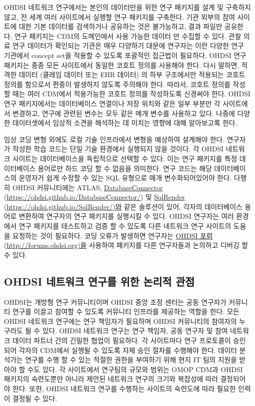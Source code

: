 \documentclass[11pt]{book}
\theoremstyle{definition}
\theoremstyle{definition}
\theoremstyle{definition}
\theoremstyle{remark}
\begin{document}
OHDSI 네트워크 연구에서는 본인의 데이터만을 위한 연구 패키지를 설계 및
구축하지 않고, 전 세계 여러 사이트에서 실행할 연구 패키지를 구축한다.
기관 외부의 참여 사이트에 대한 기본 데이터를 검색하거나 공유하는 것은
불가능하고, 결과 파일만 공유한다. 연구 패키지는 CDM의 도메인에서 사용
가능한 데이터 만 수집할 수 있다. 관찰 의료 연구 데이터가 확인되는 기관은
매우 다양하기 대문에 연구자는 이런 다양한 연구 기관에서 concept set을
적용할 수 있도록 포괄적인 접근법이 필요하다. OHDSI 연구 패키지는 종종
모든 사이트에서 동일한 코호트 정의를 사용해야 한다. 다시 말하면, 적격한
데이터 (클레임 데이터 또는 EHR 데이터) 의 하부 구조에서만 적용되는
코호트 정의를 함으로서 편중이 발생하지 않도록 주의해야 한다. 따라서,
코호트 정의를 작성할 때는 여러 CDM에서 적용가능한 코호트 정의를
작성하도록 신경써야 한다. OHDSI 연구 패키지에서는 데이터베이스 연결이나
저장 위치와 같은 일부 부분만 각 사이트에서 변경하고, 연구에 관련된
변수는 모두 같은 메개 변수를 사용하고 있다. 나중에 다양한 데이터셋에서
임상적 소견을 해석하는 데 미치는 영향에 대해 알아보고록 한다.

임상 코딩 변형 외에도 로컬 기술 인프라에서 변형을 예상하여 설계해야
한다. 연구자가 작성한 학습 코드는 단일 기술 환경에서 실행되지 않을
것이다. 각 OHDSI 네트워크 사이트는 데이터베이스을 독립적으로 선택할 수
있다. 이는 연구 패키지를 특정 데이터베이스 용어로만 하드 코딩 할 수
없음을 의미한다. 연구 코드는 해당 데이터베이스의 운영자가 쉽게 수정할 수
있는 SQL 유형으로 매개 변수화되어있어야 한다. 다행히 OHDSI 커뮤니티에는
ATLAS, \protect\hyperlink{DatabaseConnector}{DatabaseConnector}
(\url{https://ohdsi.github.io/DatabaseConnector/}) 및
\protect\hyperlink{SqlRender}{SqlRender}
(\url{https://ohdsi.github.io/SqlRender/)와} 같은 솔루션이 있어, 각자의
데이터베이스 용어로 변환하여 연구자의 연구 패키지를 실행시킬 수 있다.
OHDSI 연구자는 여러 환경에서 연구 패키지를 테스트하고 검증 할 수 있도록
다른 네트워크 연구 사이트의 도움을 요청하는 것이 필요하다. 코딩 오류가
발생하면 연구자는 \protect\hyperlink{ohdsi-}{OHDSI 포럼}
(\url{http://forums.ohdsi.org)을} 사용하여 패키지를 다른 연구자들과
논의하고 디버깅 할 수 있다.

\subsection{OHDSI 네트워크 연구를 위한 논리적 관점}\label{ohdsi-----}


OHDSI는 개방형 연구 커뮤니티이며 OHDSI 중앙 조정 센터는 공동 연구자가
커뮤니티 연구를 이끌고 참여할 수 있도록 커뮤니티 인프라를 제공하는
역할을 한다. 모든 OHDSI 네트워크 연구에는 연구 책임자가 필요하며 OHDSI
커뮤니티의 참여자의 누구라도 될 수 있다. OHDSI 네트워크 연구는 연구
책임자, 공동 연구자 및 참여 네트워크 데이터 파트너 간의 긴밀한 협업이
필요하다. 각 사이트마다 연구 프로토콜이 승인되어 각자의 CDM에서 실행될
수 있도록 자체 승인 절차를 수행해야 한다. 데이터 분석가는 연구를 수행 할
수 있는 적절한 권한을 부여하기 위해 현지 IT 팀의 지원을 받아야 할 수도
있다. 각 사이트에서 연구팀의 규모와 범위는 OMOP CDM과 OHDSI 패키지의
숙련도뿐만 아니라 제안된 네트워크 연구의 크기와 복잡성에 따라 결정되어야
한다. 또한, OHDSI 네트워크 연구를 수행하는 사이트의 숙련도에 따라 필요한
인력이 결정될 수 있다.
\end{document}
